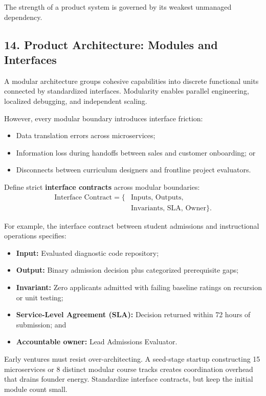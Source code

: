 The strength of a product system is governed by its weakest unmanaged dependency.

\subsection*{14. Product Architecture: Modules and Interfaces}

A modular architecture groups cohesive capabilities into discrete functional units connected by standardized interfaces. Modularity enables parallel engineering, localized debugging, and independent scaling.

However, every modular boundary introduces interface friction:
\begin{itemize}
    \item Data translation errors across microservices;
    \item Information loss during handoffs between sales and customer onboarding; or
    \item Disconnects between curriculum designers and frontline project evaluators.
\end{itemize}

Define strict \textbf{interface contracts} across modular boundaries:
\begin{equation}
\begin{aligned}
\text{Interface Contract} = \{ &\text{Inputs},\, \text{Outputs}, \\
&\text{Invariants},\, \text{SLA},\, \text{Owner} \}.
\end{aligned}
\end{equation}

For example, the interface contract between student admissions and instructional operations specifies:
\begin{itemize}
    \item \textbf{Input:} Evaluated diagnostic code repository;
    \item \textbf{Output:} Binary admission decision plus categorized prerequisite gaps;
    \item \textbf{Invariant:} Zero applicants admitted with failing baseline ratings on recursion or unit testing;
    \item \textbf{Service-Level Agreement (SLA):} Decision returned within 72 hours of submission; and
    \item \textbf{Accountable owner:} Lead Admissions Evaluator.
\end{itemize}

Early ventures must resist over-architecting. A seed-stage startup constructing 15 microservices or 8 distinct modular course tracks creates coordination overhead that drains founder energy. Standardize interface contracts, but keep the initial module count small.
